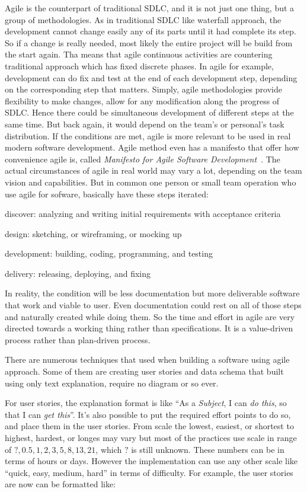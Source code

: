 Agile is the counterpart of traditional \ac{SDLC}, and it is not just one thing, but a group of methodologies.
As in traditional \ac{SDLC} like waterfall approach, the development cannot change easily any of its parts until it had complete its step.
So if a change is really needed, most likely the entire project will be build from the start again.
Tha means that agile continuous activities are countering traditional approach which has fixed discrete phases.
In agile for example, development can do fix and test at the end of each development step, depending on the corresponding step that matters.
Simply, agile methodologies provide flexibility to make changes, allow for any modification along the progress of \ac{SDLC}.
Hence there could be simultaneous development of different steps at the same time.
But back again, it would depend on the team's or personal's task distribution.
If the conditions are met, agile is more relevant to be used in real modern software development.
Agile method even has a manifesto that offer how convenience agile is, called \textit{Manifesto for Agile Software Development}~\autocite{Beck2001Manifesto}.
The actual circumstances of agile in real world may vary a lot, depending on the team vision and capabilities.
But in common one person or small team operation who use agile for sofware, basically have these steps iterated:
\begin{inparaenum}
\item discover: analyzing and writing initial requirements with acceptance criteria
\item design: sketching, or wireframing, or mocking up
\item development: building, coding, programming, and testing
\item delivery: releasing, deploying, and fixing
\end{inparaenum}
In reality, the condition will be less documentation but more deliverable software that work and viable to user.
Even documentation could rest on all of those steps and naturally created while doing them.
So the time and effort in agile are very directed towards a working thing rather than specifications.
It is a value-driven process rather than plan-driven process.

There are numerous techniques that used when building a software using agile approach.
Some of them are creating user stories and data schema that built using only text explanation, require no diagram or so ever.

For user stories, the explanation format is like ``As a \textit{Subject}, I can \textit{do this}, so that I can \textit{get this}''.
It's also possible to put the required effort points to do so, and place them in the user stories.
From scale the lowest, easiest, or shortest to highest, hardest, or longes may vary but most of the practices use scale in range of $?, 0.5, 1, 2, 3, 5, 8, 13, 21$, which $?$ is still unknown.
These numbers can be in terms of hours or days.
However the implementation can use any other scale like ``quick, easy, medium, hard'' in terms of difficulty.
For example, the user stories are now can be formatted like:

